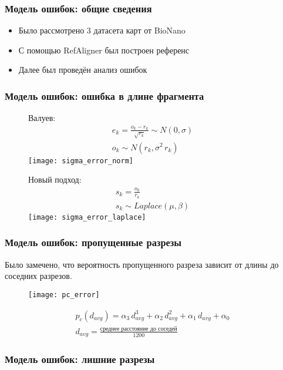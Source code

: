\begin{frame}
\frametitle{Модель ошибок: общие сведения}
\begin{itemize}
  \item Было рассмотрено 3 датасета карт от BioNano
  \item С помощью RefAligner был построен референс
  \item Далее был проведён анализ ошибок
\end{itemize}
\end{frame}

\begin{frame}
\frametitle{Модель ошибок: ошибка в длине фрагмента}


\begin{figure}
\centering
\begin{minipage}{.5\textwidth}
  Валуев:
  \begin{gather*}
  e_k = \frac{o_k - r_k}{\sqrt{r_k}} \sim N(0, \sigma) \\
  o_k \sim N(r_k, \sigma^2 \, r_k)
  \end{gather*}
  \centering
  \texttt{[image: sigma\_error\_norm]}
\end{minipage}%
\begin{minipage}{.5\textwidth}
  Новый подход:
  \begin{gather*}
  s_k = \frac{o_k}{r_k} \\
  s_k \sim Laplace(\mu, \beta)
  \end{gather*}
  \centering
  \texttt{[image: sigma\_error\_laplace]}
\end{minipage}
\end{figure}
\end{frame}

\begin{frame}
\frametitle{Модель ошибок: пропущенные разрезы}
Было замечено, что вероятность пропущенного разреза зависит от длины до соседних разрезов.
\begin{figure}
  \centering
  \texttt{[image: pc\_error]}
\end{figure}
\begin{gather*}
p_c (d_{avg}) = \alpha_3 \, d_{avg}^3 + \alpha_2 \, d_{avg}^2 +  \alpha_1 \, d_{avg} + \alpha_0 \\
d_{avg} = \frac{\text{среднее расстояние до соседей}}{1200}
\end{gather*}
\end{frame}

\begin{frame}
\frametitle{Модель ошибок: лишние разрезы}

\end{frame}
